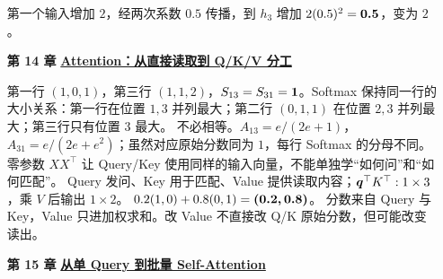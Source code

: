 \begin{enumerate}[leftmargin=5.4em,labelsep=.7em,itemsep=9pt]
\par{}第一个输入增加 $2$，经两次系数 $0.5$ 传播，到 $h_3$ 增加 $2(0.5)^2=\answerresult{0.5}$，变为 $2$。
\par{}
\item[\textbf{第 14 章}] \label{answer:attention-qkv}\textbf{\hyperref[check:attention-qkv]{Attention：从直接读取到 Q/K/V 分工}}\par\nobreak
{}\label{answer:why-attention}
第一行 $(1,0,1)$，第三行 $(1,1,2)$，$S_{13}=S_{31}=\boldsymbol{1}$。Softmax 保持同一行的大小关系：第一行在位置 $1,3$ 并列最大；第二行 $(0,1,1)$ 在位置 $2,3$ 并列最大；第三行只有位置 $3$ 最大。
不必相等。$A_{13}=e/(2e+1)$，$A_{31}=e/(2e+e^2)$；虽然对应原始分数同为 $1$，每行 Softmax 的分母不同。
零参数 $XX^\top$ 让 Query/Key 使用同样的输入向量，不能单独学“如何问”和“如何匹配”。
Query 发问、Key 用于匹配、Value 提供读取内容；$\boldsymbol{q}^\top K^\top:1\times3$，乘 $V$ 后输出 $1\times2$。
$0.2(1,0)+0.8(0,1)=\boldsymbol{(0.2,0.8)}$。
分数来自 Query 与 Key，Value 只进加权求和。改 Value 不直接改 Q/K 原始分数，但可能改变读出。
\par{}
\item[\textbf{第 15 章}] \label{answer:self-attention}\textbf{\hyperref[check:self-attention]{从单 Query 到批量 Self-Attention}}\par\nobreak

\end{enumerate}

